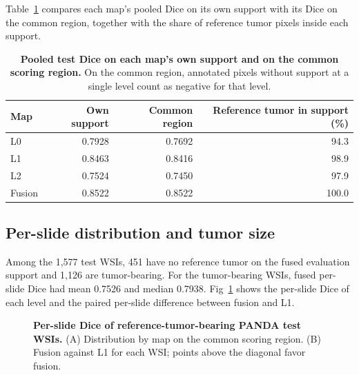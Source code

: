 \documentclass[10pt,letterpaper]{article}
\begin{document}
Table~\ref{tab:followup_common_support} compares each map's pooled Dice on its own support with its Dice on the common region, together with the share of reference tumor pixels inside each support.

\begin{table}[H]\centering
\caption{\textbf{Pooled test Dice on each map's own support and on the common scoring region.} On the common region, annotated pixels without support at a single level count as negative for that level.}\label{tab:followup_common_support}
\begin{tabular}{lrrr}\toprule
Map & Own support & Common region & Reference tumor in support (\%)\\
\midrule
L0 & 0.7928 & 0.7692 & 94.3\\
L1 & 0.8463 & 0.8416 & 98.9\\
L2 & 0.7524 & 0.7450 & 97.9\\
Fusion & 0.8522 & 0.8522 & 100.0\\
\bottomrule
\end{tabular}
\end{table}

\subsection*{Per-slide distribution and tumor size}
Among the 1,577 test WSIs, 451 have no reference tumor on the fused evaluation support and 1,126 are tumor-bearing. For the tumor-bearing WSIs, fused per-slide Dice had mean 0.7526 and median 0.7938. Fig~\ref{fig:slide} shows the per-slide Dice of each level and the paired per-slide difference between fusion and L1.

\begin{figure}[H]
\centering
\caption{\textbf{Per-slide Dice of reference-tumor-bearing PANDA test WSIs.} (A) Distribution by map on the common scoring region. (B) Fusion against L1 for each WSI; points above the diagonal favor fusion.}
\label{fig:slide}
\end{figure}
\end{document}
